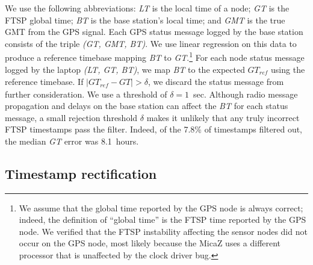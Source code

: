 We use the following abbreviations: {\em LT} is the local
time of a node; {\em GT} is the FTSP global time; {\em BT} is the base
station's local time; and {\em GMT} is the true GMT from the GPS signal.
Each GPS status message logged by the base station consists of the 
triple {\em (GT, GMT, BT)}. 
We use linear regression on this data to produce a reference
timebase mapping {\em BT} to {\em GT}.\footnote{We assume that the global
time reported by the GPS node is always correct; indeed, the definition of
``global time'' is the FTSP time reported by the GPS node. We verified that
the FTSP instability affecting the sensor nodes did not occur on the GPS
node, most likely because the MicaZ uses a different processor that is
unaffected by the clock driver bug.} For each node status message logged by
the laptop {\em (LT, GT, BT)}, we map {\em BT} to the expected
$\mathit{GT}_{\mathit{ref}}$ using the reference timebase. If $ \mid
\mathit{GT}_{\mathit{ref}} - \mathit{GT} \mid > \delta$, we discard the
status message from further consideration.  We use a threshold of $\delta =
1$~sec.  Although radio message propagation and delays on the base station
can affect the {\em BT} for each status message, a small rejection
threshold $\delta$ makes it unlikely that any truly incorrect FTSP
timestamps pass the filter. Indeed, of the 7.8\% of timestamps filtered out,
the median {\em GT} error was 8.1~hours.



\subsection{Timestamp rectification}
\label{section-timerectification}

